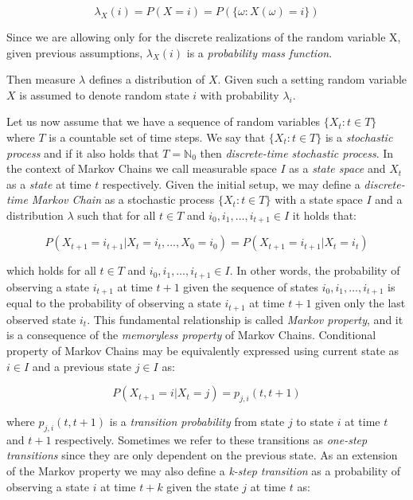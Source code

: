 \begin{equation}
\lambda_X(i) = P(X=i)=P(\{\omega: X(\omega)=i\})
\end{equation}

Since we are allowing only for the discrete realizations of the random variable X, given previous assumptions, $\lambda_X(i)$ is a {\it probability mass function}.

Then measure $\lambda$ defines a distribution of $X$. Given such a setting random variable $X$ is assumed to denote random state $i$ with probability $\lambda_i$. 

Let us now assume that we have a sequence of random variables $\{X_t : t \in T\}$ where $T$ is a countable set of time steps.
 We say that $\{X_t : t \in T\}$ is a {\it stochastic process} and if it also holds that $T = \mathbb{N}_0$ then {\it discrete-time stochastic process}.
 In the context of Markov Chains we call measurable space $I$ as a {\it state space} and $X_t$ as a {\it state} at time $t$ respectively.
 Given the initial setup, we may define a {\it discrete-time Markov Chain} as a stochastic process $\{X_t : t \in T\}$ with a state space $I$ and a distribution $\lambda$ such that for all $t \in T$ and $i_0,i_1,\ldots,i_{t+1} \in I$ it holds that:

\begin{equation} \label{DTMC}
P(X_{t+1}=i_{t+1}|X_t=i_t,\ldots,X_0=i_0) = P(X_{t+1}=i_{t+1}|X_t=i_t)
\end{equation}

which holds for all $t \in T$ and $i_0,i_1,\ldots,i_{t+1} \in I$. In other words, the probability of observing a state $i_{t+1}$ at time $t+1$ given the sequence of states $i_0,i_1,\ldots,i_{t+1}$ is equal to the probability of observing a state $i_{t+1}$ at time $t+1$ given only the last observed state $i_t$.
This fundamental relationship is called {\it Markov property}, and it is a consequence of the {\it memoryless property} of Markov Chains. 
Conditional property of Markov Chains may be equivalently expressed using current state as $i \in I$ and a previous state $j \in I$ as:

\begin{equation}
P(X_{t+1}=i|X_t=j) = p_{j,i}(t,t+1)
\end{equation}

where $p_{j,i}(t,t+1)$ is a {\it transition probability} from state $j$ to state $i$ at time $t$ and $t+1$ respectively. Sometimes we refer to these transitions as {\it one-step transitions} since they are only dependent on the previous state.
As an extension of the Markov property we may also define a {\it k-step transition} as a probability of observing a state $i$ at time $t+k$ given the state $j$ at time $t$ as:

